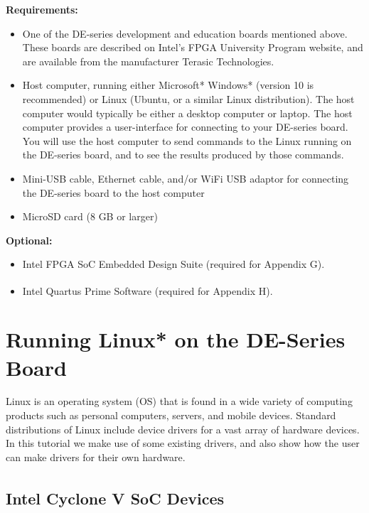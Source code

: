 \documentclass[11pt, twoside, pdftex]{article}
\begin{document}
{\bf Requirements:}
\begin{itemize}
\item One of the DE-series development and education boards mentioned above. These boards are 
described on Intel's FPGA University Program website, and are available from the manufacturer 
Terasic Technologies.

\item Host computer, running either Microsoft* Windows* (version 10 is recommended) or Linux 
(Ubuntu, or a similar Linux distribution). The host computer would typically be either a
desktop computer or laptop. The host computer provides a user-interface for connecting to
your DE-series board. You will use the host computer to send commands to the Linux
running on the DE-series board, and to see the results produced by those commands.

\item Mini-USB cable, Ethernet cable, and/or WiFi USB adaptor for connecting the DE-series board
to the host computer 

\item MicroSD card (8 GB or larger)
\end{itemize}

{\bf Optional:}
\begin{itemize}
\item Intel FPGA SoC Embedded Design Suite (required for Appendix G).
\item Intel Quartus\textsuperscript{\textregistered} Prime Software (required for Appendix H).
\end{itemize}

\section{Running Linux* on the DE-Series Board}

Linux is an operating system (OS) that is found in a wide variety of computing products such 
as personal computers, servers, and mobile devices. Standard distributions of Linux 
include device drivers for a vast array of hardware devices. In this tutorial we make use of 
some existing drivers, and also show how the user can make drivers for their own hardware. 

\subsection{Intel Cyclone\textsuperscript{\textregistered} V SoC Devices}
\end{document}
